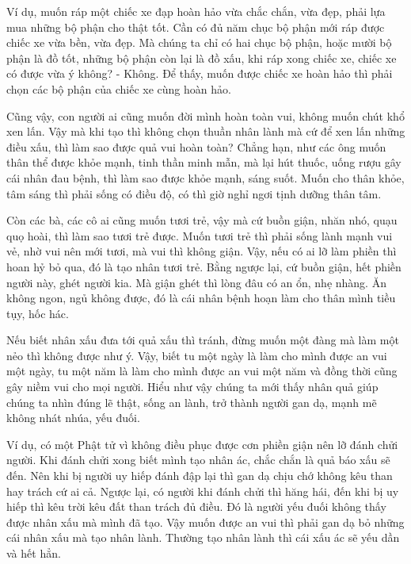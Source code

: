 \documentclass[
  12pt,
  oneside]{book}
\begin{document}
Ví dụ, muốn ráp một chiếc xe đạp hoàn hảo vừa chắc chắn, vừa đẹp, phải lựa mua những bộ phận cho thật tốt. Cần có đủ năm chục bộ phận mới ráp được chiếc xe vừa bền, vừa đẹp. Mà chúng ta chỉ có hai chục bộ phận, hoặc mười bộ phận là đồ tốt, những bộ phận còn lại là đồ xấu, khi ráp xong chiếc xe, chiếc xe có được vừa ý không? - Không. Để thấy, muốn được chiếc xe hoàn hảo thì phải chọn các bộ phận của chiếc xe cùng hoàn hảo.

Cũng vậy, con người ai cũng muốn đời mình hoàn toàn vui, không muốn chút khổ xen lấn. Vậy mà khi tạo thì không chọn thuần nhân lành mà cứ để xen lấn những điều xấu, thì làm sao được quả vui hoàn toàn? Chẳng hạn, như các ông muốn thân thể được khỏe mạnh, tinh thần minh mẫn, mà lại hút thuốc, uống rượu gây cái nhân đau bệnh, thì làm sao được khỏe mạnh, sáng suốt. Muốn cho thân khỏe, tâm sáng thì phải sống có điều độ, có thì giờ nghỉ ngơi tịnh dưỡng thân tâm.

Còn các bà, các cô ai cũng muốn tươi trẻ, vậy mà cứ buồn giận, nhăn nhó, quạu quọ hoài, thì làm sao tươi trẻ được. Muốn tươi trẻ thì phải sống lành mạnh vui vẻ, nhờ vui nên mới tươi, mà vui thì không giận. Vậy, nếu có ai lỡ làm phiền thì hoan hỷ bỏ qua, đó là tạo nhân tươi trẻ. Bằng ngược lại, cứ buồn giận, hết phiền người này, ghét người kia. Mà giận ghét thì lòng đâu có an ổn, nhẹ nhàng. Ăn không ngon, ngủ không được, đó là cái nhân bệnh hoạn làm cho thân mình tiều tụy, hốc hác.

Nếu biết nhân xấu đưa tới quả xấu thì tránh, đừng muốn một đàng mà làm một nẻo thì không được như ý. Vậy, biết tu một ngày là làm cho mình được an vui một ngày, tu một năm là làm cho mình được an vui một năm và đồng thời cũng gây niềm vui cho mọi người. Hiểu như vậy chúng ta mới thấy nhân quả giúp chúng ta nhìn đúng lẽ thật, sống an lành, trở thành người gan dạ, mạnh mẽ không nhát nhúa, yếu đuối.

Ví dụ, có một Phật tử vì không điều phục được cơn phiền giận nên lỡ đánh chửi người. Khi đánh chửi xong biết mình tạo nhân ác, chắc chắn là quả báo xấu sẽ đến. Nên khi bị người uy hiếp đánh đập lại thì gan dạ chịu chớ không kêu than hay trách cứ ai cả. Ngược lại, có người khi đánh chửi thì hăng hái, đến khi bị uy hiếp thì kêu trời kêu đất than trách đủ điều. Đó là người yếu đuối không thấy được nhân xấu mà mình đã tạo. Vậy muốn được an vui thì phải gan dạ bỏ những cái nhân xấu mà tạo nhân lành. Thường tạo nhân lành thì cái xấu ác sẽ yếu dần và hết hẳn.
\end{document}
